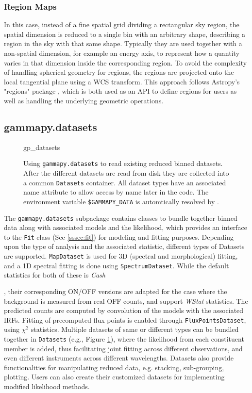 \documentclass[traditabstract, longauth]{aa}
\newcommand{\code}[1]{\texttt{#1}}
\begin{document}
{\subsubsection{Region Maps}
In this case, instead of a fine spatial grid
dividing a rectangular sky region, the spatial dimension is reduced to a single
bin with an arbitrary shape, describing a region in the sky with that same
shape. Typically they are used together with a non-spatial dimension, for
example an energy axis, to represent how a quantity varies in that dimension
inside the corresponding region. To avoid the complexity of handling
spherical geometry for regions, the regions are projected onto the local
tangential plane using a WCS transform. This approach follows Astropy's "regions"
package \citep{AstropyRegions2022}, which is both used as an API to define regions
for users as well as handling the underlying geometric operations.


\subsection{gammapy.datasets}
\label{ssec:gammapy-datasets}
%
\begin{figure}
	\small
	{gp_datasets}
	\caption{
        Using \code{gammapy.datasets} to read existing reduced binned datasets.
        After the different datasets are read from disk they are collected into a
        common \code{Datasets} container. All dataset types have an associated
        name attribute to allow access by name later in the code. The
        environment variable \code{\$GAMMAPY\_DATA} is automtically resolved
        by \gammapy.
    }
	\label{fig*:minted:gp_datasets}
\end{figure}
%
The \code{gammapy.datasets} subpackage contains classes to bundle
together binned data along with associated models and the likelihood, which
provides an interface to the \code{Fit} class (Sec \ref{sssec:fit}) for
modeling and fitting purposes. Depending upon the type of analysis and the
associated statistic, different types of Datasets are supported. \code{MapDataset} is
used for 3D (spectral and morphological) fitting, and a 1D spectral fitting is
done using \code{SpectrumDataset}. While the default statistics for both of these is
\emph{Cash}}, their corresponding ON/OFF versions are adapted for the case where the
background is measured from real OFF counts, and support \emph{WStat} statistics. The
predicted counts are computed by convolution of the models with the associated
IRFs. Fitting of precomputed flux points is enabled through \code{FluxPointsDataset},
using \emph{$\chi^2$} statistics. Multiple datasets of same or different types can be
bundled together in \code{Datasets} (e.g., Figure \ref{fig*:minted:gp_datasets}),
where the likelihood from each constituent member is added, thus facilitating
joint fitting across different observations, and even different instruments
across different wavelengths. Datasets also provide functionalities for
manipulating reduced data, e.g. stacking, sub-grouping, plotting. Users can
also create their customized datasets for implementing modified likelihood
methods.
\end{document}

